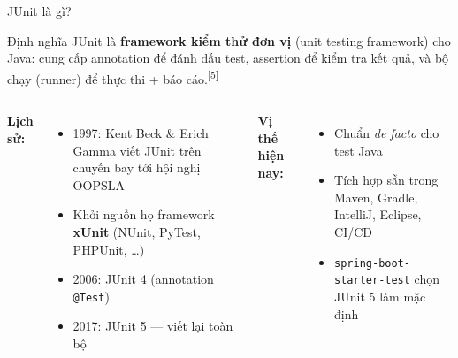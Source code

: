 \documentclass[aspectratio=169,12pt]{beamer}
\newcommand{\sref}[1]{\textsuperscript{\scriptsize[#1]}}
\begin{document}
\begin{frame}[shrink=8]{JUnit là gì?}
  \begin{block}{Định nghĩa}
    JUnit là \textbf{framework kiểm thử đơn vị} (unit testing framework)
    cho Java: cung cấp annotation để đánh dấu test, assertion để
    kiểm tra kết quả, và bộ chạy (runner) để thực thi + báo cáo.\sref{5}
  \end{block}

  \vspace{0.35em}
  \begin{columns}
    \textbf{Lịch sử:}
    \begin{itemize}
      \item 1997: Kent Beck \& Erich Gamma viết JUnit
            trên chuyến bay tới hội nghị OOPSLA
      \item Khởi nguồn họ framework \textbf{xUnit}
            (NUnit, PyTest, PHPUnit, \dots)
      \item 2006: JUnit 4 (annotation \texttt{@Test})
      \item 2017: JUnit 5 --- viết lại toàn bộ
    \end{itemize}

    \textbf{Vị thế hiện nay:}
    \begin{itemize}
      \item Chuẩn \textit{de facto} cho test Java
      \item Tích hợp sẵn trong Maven, Gradle, IntelliJ, Eclipse, CI/CD
      \item \texttt{spring-boot-\allowbreak starter-test} chọn JUnit 5 làm mặc định
    \end{itemize}
  \end{columns}
\end{frame}
\end{document}
